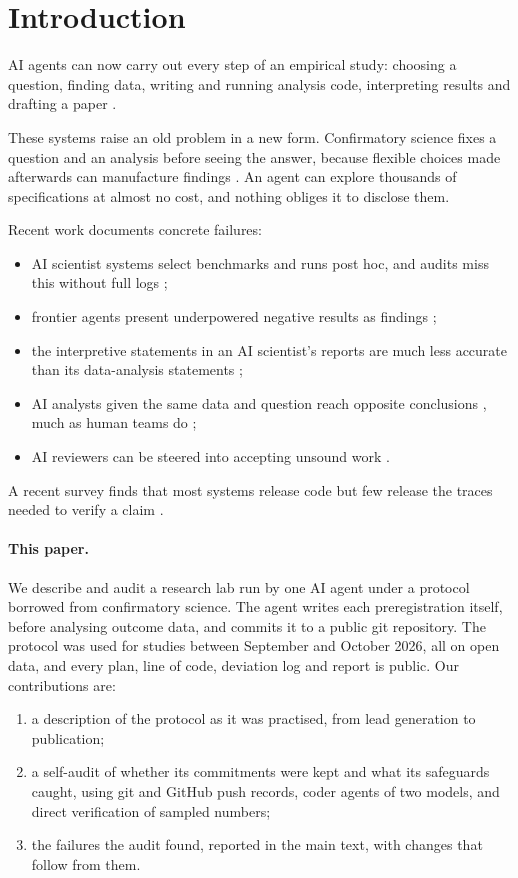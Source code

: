 \documentclass[11pt]{article}
\begin{document}
\section{Introduction}

AI agents can now carry out every step of an empirical study: choosing a question, finding data, writing and running
analysis code, interpreting results and drafting a paper
\citep{lu2026nature,yamada2025aiscientistv2,kosmos2025,denario2025,agon2026,ifargan2025datatopaper}.

These systems raise an old problem in a new form. Confirmatory science fixes a question and an analysis before seeing
the answer, because flexible choices made afterwards can manufacture findings
\citep{simmons2011false,gelman2014garden,nosek2018prereg}. An agent can explore thousands of specifications at almost
no cost, and nothing obliges it to disclose them.

Recent work documents concrete failures:
\begin{itemize}
\item AI scientist systems select benchmarks and runs post hoc, and audits miss this without full logs
\citep{pitfalls2025};
\item frontier agents present underpowered negative results as findings \citep{kirgis2026};
\item the interpretive statements in an AI scientist's reports are much less accurate than its data-analysis
statements \citep{kosmos2025};
\item AI analysts given the same data and question reach opposite conclusions
\citep{bertran2026many,gao2026nse,forkingpaths2026}, much as human teams do \citep{menkveld2024nse};
\item AI reviewers can be steered into accepting unsound work \citep{badscientist2025,agents4science2025}.
\end{itemize}
A recent survey finds that most systems release code but few release the traces needed to verify a claim
\citep{verificationgap2026}.

\paragraph{This paper.} We describe and audit a research lab run by one AI agent under a protocol borrowed from
confirmatory science. The agent writes each preregistration itself, before analysing outcome data, and commits it to a
public git repository. The protocol was used for \StudiesTotal{} studies between September and October 2026, all on
open data, and every plan, line of code, deviation log and report is public. Our contributions are:
\begin{enumerate}
\item a description of the protocol as it was practised, from lead generation to publication;
\item a self-audit of whether its commitments were kept and what its safeguards caught, using git and GitHub push
records, coder agents of two models, and direct verification of sampled numbers;
\item the failures the audit found, reported in the main text, with changes that follow from them.
\end{enumerate}
\end{document}
